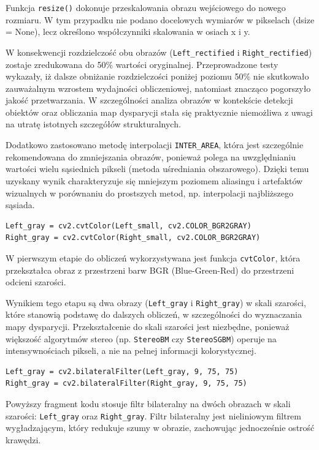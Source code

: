 \documentclass[magisterska]{pracadypl}
\begin{document}
Funkcja \texttt{resize()} dokonuje przeskalowania obrazu wejściowego do nowego rozmiaru. W tym przypadku nie podano docelowych wymiarów w pikselach (dsize = None), lecz określono współczynniki skalowania w osiach x i y.

W konsekwencji rozdzielczość obu obrazów (\texttt{Left\_rectified} i \texttt{Right\_rectified}) zostaje zredukowana do 
50\% wartości oryginalnej. Przeprowadzone testy wykazały, iż dalsze obniżanie rozdzielczości poniżej poziomu 50\% nie skutkowało zauważalnym wzrostem wydajności obliczeniowej, natomiast znacząco pogorszyło jakość przetwarzania. W szczególności analiza obrazów w kontekście detekcji obiektów oraz obliczania map dysparycji stała się praktycznie niemożliwa z uwagi na utratę istotnych szczegółów strukturalnych.

Dodatkowo zastosowano metodę interpolacji \texttt{INTER\_AREA}, która jest szczególnie rekomendowana do zmniejszania obrazów, ponieważ polega na uwzględnianiu wartości wielu sąsiednich pikseli (metoda uśredniania obszarowego). Dzięki temu uzyskany wynik charakteryzuje się mniejszym poziomem aliasingu i artefaktów wizualnych w porównaniu do prostszych metod, np. interpolacji najbliższego sąsiada.

\begin{lstlisting}[style=mypython]
Left_gray = cv2.cvtColor(Left_small, cv2.COLOR_BGR2GRAY)
Right_gray = cv2.cvtColor(Right_small, cv2.COLOR_BGR2GRAY)
\end{lstlisting}

W pierwszym etapie do obliczeń wykorzystywana jest funkcja \texttt{cvtColor}, która przekształca obraz z przestrzeni barw BGR (Blue-Green-Red) do przestrzeni odcieni szarości. 

Wynikiem tego etapu są dwa obrazy (\texttt{Left\_gray} i \texttt{Right\_gray}) w skali szarości, które stanowią podstawę do dalszych obliczeń, w szczególności do wyznaczania mapy dysparycji. Przekształcenie do skali szarości jest niezbędne, ponieważ większość algorytmów stereo (np. \texttt{StereoBM} czy \texttt{StereoSGBM}) operuje na intensywnościach pikseli, a nie na pełnej informacji kolorystycznej.

\begin{lstlisting}[style=mypython]
Left_gray = cv2.bilateralFilter(Left_gray, 9, 75, 75)
Right_gray = cv2.bilateralFilter(Right_gray, 9, 75, 75)
\end{lstlisting}

Powyższy fragment kodu stosuje filtr bilateralny na dwóch obrazach w skali szarości: \texttt{Left\_gray} oraz \texttt{Right\_gray}. Filtr bilateralny jest nieliniowym filtrem wygładzającym, który redukuje szumy w obrazie, zachowując jednocześnie ostrość krawędzi.
\end{document}
